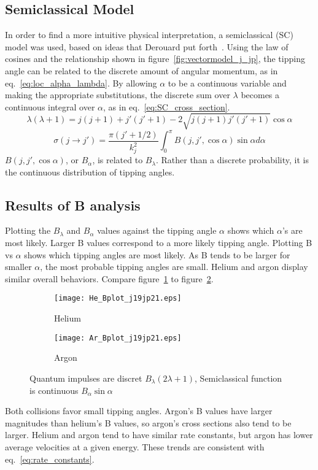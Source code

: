 \documentclass[letterpaper,titlepage,12pt]{article}
\begin{document}
\subsection{Semiclassical Model}
In order to find a more intuitive physical interpretation, a semiclassical (SC)
model was used, based on ideas that Derouard put forth~\cite{Der84}.  Using the
law of cosines and the relationship shown in figure~\ref{fig:vectormodel_j_jp},
the tipping angle can be related to the discrete amount of angular momentum, as
in eq.~\ref{eq:loc_alpha_lambda}.  By allowing $\alpha$ to be a continuous
variable and making the appropriate substitutions, the discrete sum over
$\lambda$ becomes a continuous integral over $\alpha$, as in
eq.~\ref{eq:SC_cross_section}.
\begin{equation}
    \lambda(\lambda+1)=j(j+1)+j'(j'+1)-2\sqrt{j(j+1)j'(j'+1)}\cos\alpha
    \label{eq:loc_alpha_lambda}
\end{equation}
\begin{equation}
    \sigma(j\rightarrow j')=\frac{\pi(j'+1/2)}{k_j^2}{\int_{0}^{\pi}{B(j,j',\cos\alpha)\sin\alpha d\alpha}}
    \label{eq:SC_cross_section}
\end{equation}
$B(j,j',\cos\alpha)$, or $B_\alpha$, is related to $B_\lambda$.  Rather than a
discrete probability, it is the continuous distribution of tipping angles.

\subsection{Results of B analysis}
Plotting the $B_\lambda$ and $B_\alpha$ values against the tipping angle
$\alpha$ shows which $\alpha$'s are most likely.  Larger B values correspond to
a more likely tipping angle.  Plotting B vs $\alpha$ shows which tipping angles
are most likely.  As B tends to be larger for smaller $\alpha$, the most
probable tipping angles are small.  Helium and argon display similar overall
behaviors.  Compare figure~\ref{fig:He_B_1921} to figure~\ref{fig:Ar_B_1921}.
\begin{figure}[ht!]
    \centering
    \begin{subfigure}{0.49\textwidth}
        \texttt{[image: He\_Bplot\_j19jp21.eps]}
        \caption{Helium}
\label{fig:He_B_1921}
    \end{subfigure}
    \hspace*{\fill}
    \begin{subfigure}{0.49\textwidth}
        \texttt{[image: Ar\_Bplot\_j19jp21.eps]}
        \caption{Argon}
\label{fig:Ar_B_1921}
    \end{subfigure}
    \caption{Quantum impulses are discret $B_\lambda(2\lambda+1)$, Semiclassical function is continuous $B_\alpha\sin\alpha$}
\label{fig:B_plots}
\end{figure}
\newline Both collisions favor small tipping angles.  Argon's B values have
larger magnitudes than helium's B values, so argon's cross sections also tend
to be larger.  Helium and argon tend to have similar rate constants, but argon
has lower average velocities at a given energy.  These trends are consistent
with eq.~\ref{eq:rate_constants}.
\end{document}
